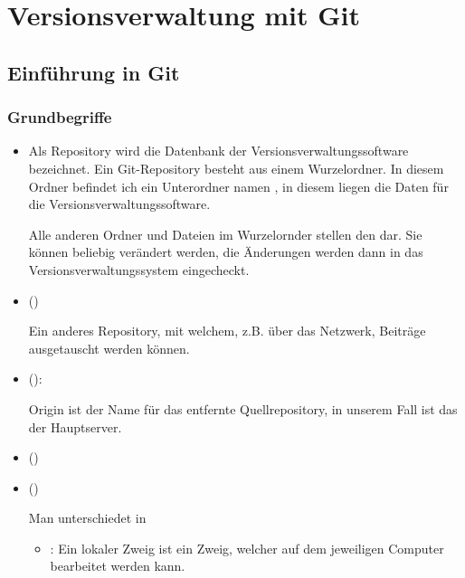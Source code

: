 \documentclass[
ngerman,
paper=a4,
asymmetric,
fontsize=10pt,
draft=false,
numbers=noenddot,
bibtotocnumbered,
footnotes=multiple,
toc=flat,
]{scrbook}
\begin{document}
\chapter{Versions\-ver\-waltung mit Git}


\section{Einführung in Git}



\subsection{Grundbegriffe}

\begin{itemize}
  \item {} \emph{} \par Als Repository wird
  die Datenbank der Versionsverwaltungssoftware bezeichnet.
  Ein Git-Repository besteht aus einem Wurzelordner. In
  diesem Ordner befindet ich ein Unterordner namen ,
  in diesem liegen die Daten für die
  Versionsverwaltungssoftware. \par Alle anderen Ordner
  und Dateien im Wurzelornder stellen den 
  dar. Sie können beliebig verändert werden, die Änderungen
  werden dann in das Versionsverwaltungssystem
  eingecheckt.
  \item {} () \par Ein anderes Repository, mit welchem,
  z.B. über das Netzwerk, Beiträge ausgetauscht werden
  können.
  \item {} (): \par Origin ist der Name
  für das entfernte Quellrepository, in unserem Fall ist
  das der Hauptserver.
  \item {} ()
  \item {} () \par Man unterschiedet in
  \begin{itemize}
    \item {}: Ein lokaler Zweig ist ein
    Zweig, welcher auf dem jeweiligen Computer bearbeitet
    werden kann. 
    

\end{itemize}
\end{itemize}
\end{document}
